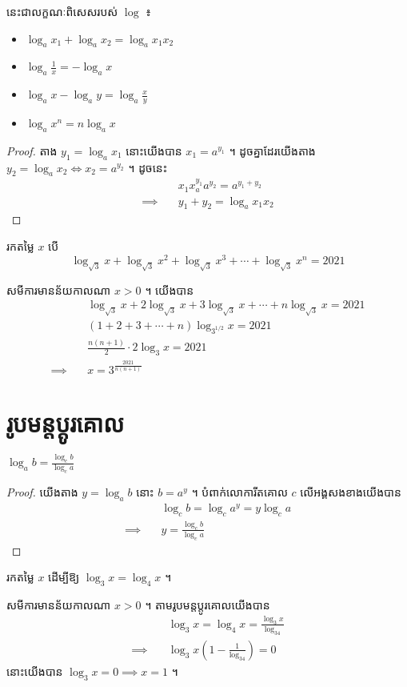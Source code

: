 \begin{theorem}
នេះជាលក្ខណៈពិសេសរបស់ $\log$ ៖
\begin{itemize}
\item $\log_ax_1+\log_ax_2=\log_ax_1x_2$
\item $\log_a\frac{1}{x}=-\log_ax$
\item $\log_ax-\log_ay=\log_a\frac{x}{y}$
\item $\log_ax^n=n\log_ax$
\end{itemize}
\end{theorem}
\begin{proof}
តាង $y_1=\log_ax_1$ នោះយើងបាន $x_1=a^{y_1}$ ។ ដូចគ្នាដែរយើងតាង
$y_2=\log_ax_2\iff x_2=a^{y_2}$ ។ ដូចនេះ
\begin{align*}
&x_1x_a^{y_1}a^{y_2}=a^{y_1+y_2}\\
\implies\quad &y_1+y_2=\log_a x_1x_2
\end{align*}
\end{proof}

\begin{example}
រកតម្លៃ $x$ បើ
\[
\log_{\sqrt{3}}x+\log_{\sqrt{3}}x^2+\log_{\sqrt{3}}x^3+
\cdots+\log_{\sqrt{3}}x^n=2021
\]
\end{example}
\begin{solution}
សមីការមានន័យកាលណា $x>0$ ។ យើងបាន
\begin{align*}
&\log_{\sqrt{3}}x+2\log_{\sqrt{3}}x+3\log_{\sqrt{3}}x+\cdots+n\log_{\sqrt{3}}x
	=2021\\
&(1+2+3+\cdots+n)\log_{3^{1/2}}x=2021\\
&\frac{n(n+1)}{2}\cdot 2\log_{3}x=2021\\
\implies\quad &x=3^{\frac{2021}{n(n+1)}}
\end{align*}
\end{solution}

\newpage  %
\section{រូបមន្តប្តូរគោល}
\begin{theorem}[រូបមន្តប្តូរគោល]
$\log_ab=\frac{\log_cb}{\log_ca}$
\end{theorem}
\begin{proof}
យើងតាង $y=\log_ab$ នោះ $b=a^y$ ។ បំពាក់លោការីតគោល $c$ លើអង្គសងខាងយើងបាន
\begin{align*}
&\log_cb=\log_ca^y=y\log_ca\\
\implies\quad &y=\frac{\log_cb}{\log_ca}
\end{align*}
\end{proof}
\begin{example}
រកតម្លៃ $x$ ដើម្បីឱ្យ $\log_3x=\log_4x$ ។
\end{example}
\begin{solution}
សមីការមានន័យកាលណា $x>0$ ។ តាមរូបមន្តប្តូរគោលយើងបាន
\begin{align*}
&\log_3x=\log_4x=\frac{\log_3x}{\log_34}\\
\implies\quad &\log_3x\left(1-\frac{1}{\log_34}\right)=0
\end{align*}
នោះយើងបាន $\log_3x=0\implies x=1$ ។
\end{solution}

